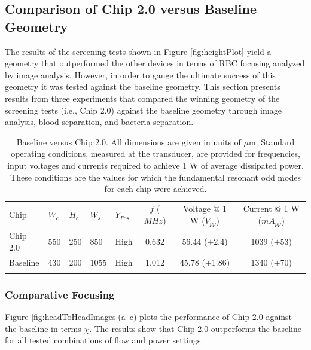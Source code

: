 \subsection{Comparison of Chip 2.0 versus Baseline Geometry}
\label{ssec:comparison}

The results of the screening tests shown in Figure \ref{fig:heightPlot} yield a geometry that outperformed the other devices in terms of RBC focusing analyzed by image analysis. However, in order to gauge the ultimate success of this geometry it was tested against the baseline geometry. This section presents results from three experiments that compared the winning geometry of the screening tests (i.e., Chip 2.0) against the baseline geometry through image analysis, blood separation, and bacteria separation.

\begin{table}[t]
	\caption[Standard operating conditions for Baseline versus Chip 2.0]{Baseline versus Chip 2.0. All dimensions are given in units of $\mu$m. Standard operating conditions, measured at the transducer, are provided for frequencies, input voltages and currents required to achieve 1 W of average dissipated power. These conditions are the values for which the fundamental resonant odd modes for each chip were achieved.}
\label{tab:comparison}       %
\centering
\begin{tabular}{lllll | ccc}
\hline\noalign{\smallskip}
Chip & $W_c$ & $H_c$ & $W_s$ & $Y_{Pos}$ & $f$ ($MHz$) & Voltage @ 1 W ($V_{pp}$) & Current @ 1 W ($mA_{pp}$) \\
\noalign{\smallskip}\hline\noalign{\smallskip}
Chip 2.0 & 550 & 250 & 850 & High & 0.632 & 56.44 ($\pm$2.4) & 1039 ($\pm$53)\\
Baseline & 430 & 200 &  1055 & High & 1.012 & 45.78 ($\pm$1.86)& 1340 ($\pm$70)\\ 
\noalign{\smallskip}\hline
\end{tabular}
\end{table}

\subsubsection{Comparative Focusing}
\label{sssec:comparisonFocusing}

Figure \ref{fig:headToHeadImages}(a--c) plots the performance of Chip 2.0 against the baseline in terms $\chi$. The results show that Chip 2.0 outperforms the baseline for all tested combinations of flow and power settings.

